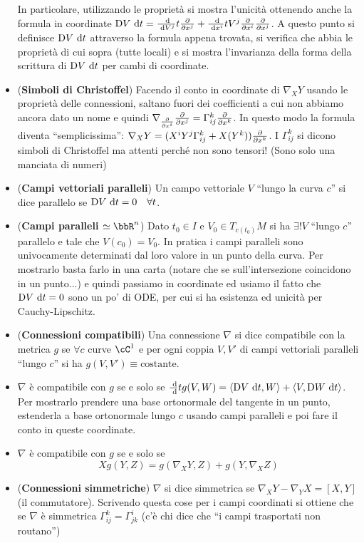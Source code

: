 \documentclass[a4paper,NoNotes,GeneralMath]{stdmdoc}
\newcommand{\Dde}[1]{\ensuremath{\text{D} {#1}}{\de t}}
\newcommand{\lra}[1]{\ensuremath{\langle {#1} \rangle}}
\begin{document}
\begin{itemize}
  In particolare, utilizzando le proprietà si mostra l'unicità ottenendo anche la formula in coordinate $\Dde{V} = \dde{V^j}{t} \dpar{}{x^j} + \dde{x^i}{t} V^j \dpar{}{x^i} \dpar{}{x^j}$. A questo punto si definisce $\Dde{V}$ attraverso la formula appena trovata, si verifica che abbia le proprietà di cui sopra (tutte locali) e si mostra l'invarianza della forma della scrittura di $\Dde{V}$ per cambi di coordinate.
\item ({\bf Simboli di Christoffel}) Facendo il conto in coordinate di $\nabla_X Y$ usando le proprietà delle connessioni, saltano fuori dei coefficienti a cui non abbiamo ancora dato un nome e quindi $\nabla_{\dpar{}{x^i}} \dpar{}{x^j} = \Gamma_{ij}^k \dpar{}{x^k}$. In questo modo la formula diventa ``semplicissima'': $\nabla_X Y = (X^i Y^j \Gamma_{ij}^k + X(Y^k)) \dpar{}{x^k}$. I $\Gamma_{ij}^k$ si dicono simboli di Christoffel ma attenti perché non sono tensori! (Sono solo una manciata di numeri)
\item ({\bf Campi vettoriali paralleli}) Un campo vettoriale $V$ ``lungo la curva $c$'' si dice parallelo se $\Dde{V} = 0 \quad \forall t$.
\item ({\bf Campi paralleli $\simeq \bbR^n$}) Dato $t_0 \in I$ e $V_0 \in T_{c(t_0)}M$ si ha $\exists! V$ ``lungo $c$'' parallelo e tale che $V(c_0) = V_0$. In pratica i campi paralleli sono univocamente determinati dal loro valore in un punto della curva.
  Per mostrarlo basta farlo in una carta (notare che se sull'intersezione coincidono in un punto...) e quindi passiamo in coordinate ed usiamo il fatto che $\Dde{V} = 0$ sono un po' di ODE, per cui si ha esistenza ed unicità per Cauchy-Lipschitz.
\item ({\bf Connessioni compatibili}) Una connessione $\nabla$ si dice compatibile con la metrica $g$ se $\forall c$ curve $\cC^1$ e per ogni coppia $V, V'$ di campi vettoriali paralleli ``lungo $c$'' si ha $g(V, V') \equiv \text{costante}$.
\item $\nabla$ è compatibile con $g$ se e solo se $\dde{}{t} g(V, W) = \lra{\Dde{V}, W} + \lra{V, \Dde{W}}$. Per mostrarlo prendere una base ortonormale del tangente in un punto, estenderla a base ortonormale lungo $c$ usando campi paralleli e poi fare il conto in queste coordinate.
\item $\nabla$ è compatibile con $g$ se e solo se
  \begin{equation}
    \label{eq:cobordanza}
    X g(Y, Z) = g(\nabla_X Y, Z) + g(Y, \nabla_X Z)
  \end{equation}
\item ({\bf Connessioni simmetriche}) $\nabla$ si dice simmetrica se $\nabla_X Y - \nabla_Y X = [X, Y]$ (il commutatore). Scrivendo questa cose per i campi coordinati si ottiene che se $\nabla$ è simmetrica $\Gamma_{ij}^k = \Gamma_{jk}^i$ (c'è chi dice che ``i campi trasportati non routano'')

\end{itemize}
\end{document}

